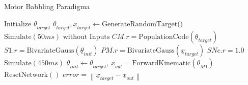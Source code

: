 \documentclass[a4, landscape]{article}
\begin{document}
	
	\begin{algorithm}
		\caption{Motor Babbling Paradigma}
		\scriptsize
		\begin{spacing}{1.1} %
			\begin{algorithmic}[1]
				\State Initialize $\underline{\theta}_{target}$
				\State $\underline{\theta}_{target}, \underline{x}_{target} \gets \text{GenerateRandomTarget()}$
				\State $\text{Simulate}(50 ms) \text{ without Inputs}$
				\State $CM.r = \text{PopulationCode}(\underline{\theta}_{target})$
				\State $S1.r = \text{BivariateGauss}(\underline{\theta}_{init})$
				\State $PM.r = \text{BivariateGauss}( \underline{x}_{target})$
				\State $SNc.r = 1.0$
				\State $\text{Simulate}(450 ms)$
				\State $\underline{\theta}_{init} \gets \underline{\theta}_{target}$, $\underline{x}_{out}=\text{ForwardKinematic}(\underline{\theta}_{M1}) $
				\State $\text{ResetNetwork}()$	
				\small
				\EndFor
				\EndFunction
				\Return $error = \left\lVert \underline{x}_{target} - \underline{x}_{out} \right\rVert$
				\EndFunction
				\EndFor
			\end{algorithmic}
		\end{spacing}
	\end{algorithm}
	
\end{document}
